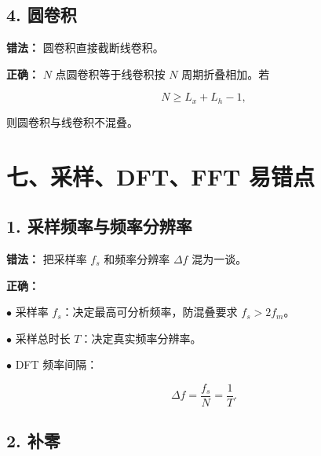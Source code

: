 \documentclass[11pt]{ctexart}
\begin{document}
\subsection*{4. 圆卷积}



\textbf{错法：} 圆卷积直接截断线卷积。\par



\textbf{正确：} \(N\) 点圆卷积等于线卷积按 \(N\) 周期折叠相加。若\par

\[

N\ge L_x+L_h-1,

\]

则圆卷积与线卷积不混叠。\par



\section*{七、采样、DFT、FFT 易错点}



\subsection*{1. 采样频率与频率分辨率}



\textbf{错法：} 把采样率 \(f_s\) 和频率分辨率 \(\Delta f\) 混为一谈。\par



\textbf{正确：}\par



\noindent\(\bullet\) 采样率 \(f_s\)：决定最高可分析频率，防混叠要求 \(f_s>2f_m\)。\par

\noindent\(\bullet\) 采样总时长 \(T\)：决定真实频率分辨率。\par

\noindent\(\bullet\) DFT 频率间隔：\par

\[

  \Delta f=\frac{f_s}{N}=\frac{1}{T}.

  \]



\subsection*{2. 补零}
\end{document}
